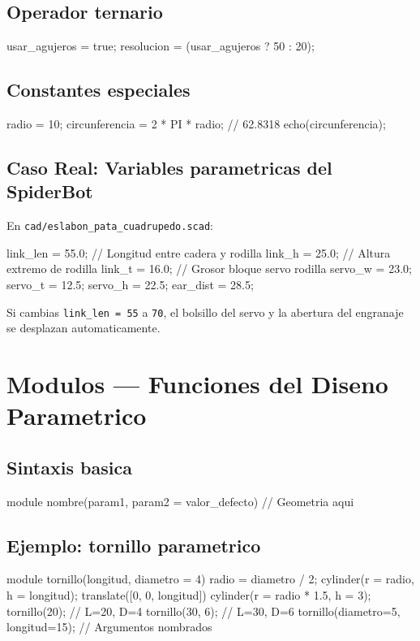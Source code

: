 \documentclass[12pt, oneside, a4paper]{report}
\newcommand{\codigo}[1]{\texttt{#1}}
\begin{document}
\section{Operador ternario}
\begin{openscad}
usar_agujeros = true;
resolucion = (usar_agujeros ? 50 : 20);
\end{openscad}

\section{Constantes especiales}
\begin{openscad}
radio = 10;
circunferencia = 2 * PI * radio;  // 62.8318
echo(circunferencia);
\end{openscad}

\section{Caso Real: Variables parametricas del SpiderBot}
En \codigo{cad/eslabon\_pata\_cuadrupedo.scad}:
\begin{openscad}
link_len = 55.0; // Longitud entre cadera y rodilla
link_h = 25.0;   // Altura extremo de rodilla
link_t = 16.0;   // Grosor bloque servo rodilla
servo_w = 23.0;  servo_t = 12.5;
servo_h = 22.5;  ear_dist = 28.5;
\end{openscad}

Si cambias \codigo{link\_len = 55} a \codigo{70}, el bolsillo del servo y la abertura del engranaje se desplazan automaticamente.

\chapter{Modulos --- Funciones del Diseno Parametrico}

\section{Sintaxis basica}
\begin{openscad}
module nombre(param1, param2 = valor_defecto) {
    // Geometria aqui
}
\end{openscad}

\section{Ejemplo: tornillo parametrico}
\begin{openscad}
module tornillo(longitud, diametro = 4) {
    radio = diametro / 2;
    cylinder(r = radio, h = longitud);
    translate([0, 0, longitud])
        cylinder(r = radio * 1.5, h = 3);
}
tornillo(20);                   // L=20, D=4
tornillo(30, 6);                // L=30, D=6
tornillo(diametro=5, longitud=15);  // Argumentos nombrados
\end{openscad}
\end{document}
